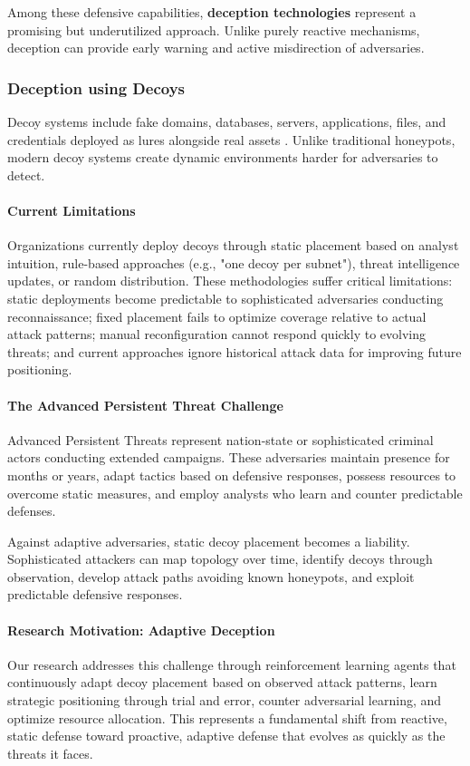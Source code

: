 \documentclass[12pt,oneside]{article}
\begin{document}
Among these defensive capabilities, \textbf{deception technologies} represent a promising but underutilized approach. Unlike purely reactive mechanisms, deception can provide early warning and active misdirection of adversaries.

\clearpage

\subsubsection{Deception using Decoys} 

Decoy systems include fake domains, databases, servers, applications, files, and credentials deployed as lures alongside real assets \cite{anwar2022honeypot}. Unlike traditional honeypots, modern decoy systems create dynamic environments harder for adversaries to detect.

\paragraph{Current Limitations} Organizations currently deploy decoys through static placement based on analyst intuition, rule-based approaches (e.g., "one decoy per subnet"), threat intelligence updates, or random distribution. These methodologies suffer critical limitations: static deployments become predictable to sophisticated adversaries conducting reconnaissance; fixed placement fails to optimize coverage relative to actual attack patterns; manual reconfiguration cannot respond quickly to evolving threats; and current approaches ignore historical attack data for improving future positioning.

\paragraph{The Advanced Persistent Threat Challenge} Advanced Persistent Threats represent nation-state or sophisticated criminal actors conducting extended campaigns. These adversaries maintain presence for months or years, adapt tactics based on defensive responses, possess resources to overcome static measures, and employ analysts who learn and counter predictable defenses.

Against adaptive adversaries, static decoy placement becomes a liability. Sophisticated attackers can map topology over time, identify decoys through observation, develop attack paths avoiding known honeypots, and exploit predictable defensive responses.

\paragraph{Research Motivation: Adaptive Deception} Our research addresses this challenge through reinforcement learning agents that continuously adapt decoy placement based on observed attack patterns, learn strategic positioning through trial and error, counter adversarial learning, and optimize resource allocation. This represents a fundamental shift from reactive, static defense toward proactive, adaptive defense that evolves as quickly as the threats it faces.
\end{document}
